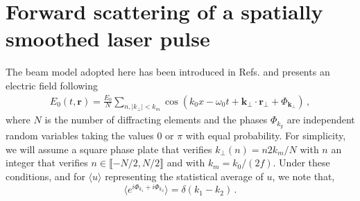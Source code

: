 \documentclass[
 reprint,
 amsmath,amssymb,
 aps,
]{revtex4-1}
\begin{document}
\section{Forward scattering of a spatially smoothed laser pulse}
The  beam model adopted here has been introduced in  Refs. \cite[]{POF_Schmitt_88,POF_Rose_93} and presents an electric field following
 \begin{align}
E_0(t,\mathbf{r})  = \frac{E_0}{N} \sum_{n,\vert k_{\perp}\vert<k_m }  \cos(k_0x - \omega_0t +\mathbf{k}_\perp \cdot \mathbf{r}_\perp +\Phi_{\mathbf{k}_\perp})\, , \label{eq:erpp}
 \end{align}
 where  $N$ is the number of diffracting elements and the phases $\Phi_{k_y}$ are  independent random variables taking the values $0$ or $\pi$ with equal probability.
 For simplicity, we will assume a square phase plate that verifies $k_{\perp}(n) = n2k_m/N$ with $n$ an integer that verifies $n\in \llbracket - N/2 ,N/2 \rrbracket$ and with $k_m = k_0/(2f)$. 
 Under these conditions, and for $\langle u\rangle$ representing the statistical average of $u$,  we note   that,
 \begin{equation}\label{eq:d}
 \langle e^{i\Phi_{k_1}+i\Phi_{k_2}}\rangle=\delta(k_1-k_2) \, .
 \end{equation}
\end{document}

